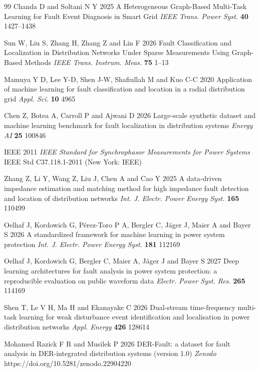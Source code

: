 \documentclass[11pt]{article}
\newcommand{\hlnew}[1]{#1}
\begin{document}
\begin{thebibliography}{99}
 \hlnew{Chanda D and Soltani N Y 2025 A Heterogeneous Graph-Based Multi-Task Learning for Fault Event Diagnosis in Smart Grid \textit{IEEE Trans. Power Syst.} \textbf{40} 1427--1438}

 \hlnew{Sun W, Liu S, Zhang H, Zhang Z and Lin F 2026 Fault Classification and Localization in Distribution Networks Under Sparse Measurements Using Graph-Based Methods \textit{IEEE Trans. Instrum. Meas.} \textbf{75} 1--13}

 Mamuya Y D, Lee Y-D, Shen J-W, Shafiullah M and Kuo C-C 2020 Application of machine learning for fault classification and location in a radial distribution grid \textit{Appl. Sci.} \textbf{10} 4965

 \hlnew{Chen Z, Botea A, Carroll P and Ajwani D 2026 Large-scale synthetic dataset and machine learning benchmark for fault localization in distribution systems \textit{Energy AI} \textbf{25} 100846}

 IEEE 2011 \textit{IEEE Standard for Synchrophasor Measurements for Power Systems} IEEE Std C37.118.1-2011 (New York: IEEE)

 \hlnew{Zhang Z, Li Y, Wang Z, Liu J, Chen A and Cao Y 2025 A data-driven impedance estimation and matching method for high impedance fault detection and location of distribution networks \textit{Int. J. Electr. Power Energy Syst.} \textbf{165} 110499}

 \hlnew{Oelhaf J, Kordowich G, Pérez-Toro P A, Bergler C, Jäger J, Maier A and Bayer S 2026 A standardized framework for machine learning in power system protection \textit{Int. J. Electr. Power Energy Syst.} \textbf{181} 112169}

 \hlnew{Oelhaf J, Kordowich G, Bergler C, Maier A, J\"ager J and Bayer S 2027 Deep learning architectures for fault analysis in power system protection: a reproducible evaluation on public waveform data \textit{Electr. Power Syst. Res.} \textbf{265} 114169}

 \hlnew{Shen T, Le V H, Ma H and Ekanayake C 2026 Dual-stream time-frequency multi-task learning for weak disturbance event identification and localisation in power distribution networks \textit{Appl. Energy} \textbf{426} 128614}

 \hlnew{Mohamed Razick F R and Musilek P 2026 DER-Fault: a dataset for fault analysis in DER-integrated distribution systems (version 1.0) \textit{Zenodo} https://doi.org/10.5281/zenodo.22904220}


\end{thebibliography}
\end{document}
